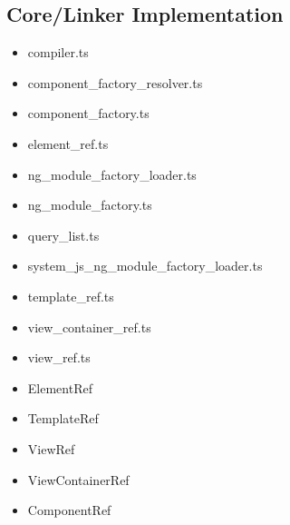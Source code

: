 \subsection{Core/Linker Implementation}


\begin{itemize}
  \item compiler.ts
  \item component\_factory\_resolver.ts
  \item component\_factory.ts
  \item element\_ref.ts
  \item ng\_module\_factory\_loader.ts
  \item ng\_module\_factory.ts
  \item query\_list.ts
  \item system\_js\_ng\_module\_factory\_loader.ts
  \item template\_ref.ts
  \item view\_container\_ref.ts
  \item view\_ref.ts
\end{itemize}


\begin{itemize}
  \item ElementRef
  \item TemplateRef
  \item ViewRef
  \item ViewContainerRef
  \item ComponentRef
\end{itemize}



